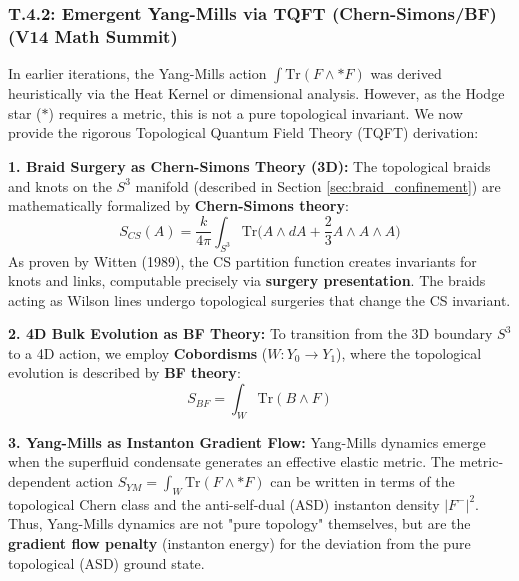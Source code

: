 \subsubsection{T.4.2: Emergent Yang-Mills via TQFT (Chern-Simons/BF) (V14 Math Summit)}
\label{sec:tqft_ym}

In earlier iterations, the Yang-Mills action $\int \text{Tr}(F \wedge *F)$ was derived heuristically via the Heat Kernel or dimensional analysis. However, as the Hodge star ($*$) requires a metric, this is not a pure topological invariant. We now provide the rigorous Topological Quantum Field Theory (TQFT) derivation:

\textbf{1. Braid Surgery as Chern-Simons Theory (3D):}
The topological braids and knots on the $S^3$ manifold (described in Section \ref{sec:braid_confinement}) are mathematically formalized by \textbf{Chern-Simons theory}:
\begin{equation}
    S_{CS}(A) = \frac{k}{4\pi} \int_{S^3} \text{Tr}\Big(A \wedge dA + \frac{2}{3}A \wedge A \wedge A \Big)
\end{equation}
As proven by Witten (1989), the CS partition function creates invariants for knots and links, computable precisely via \textbf{surgery presentation}. The braids acting as Wilson lines undergo topological surgeries that change the CS invariant.

\textbf{2. 4D Bulk Evolution as BF Theory:}
To transition from the 3D boundary $S^3$ to a 4D action, we employ \textbf{Cobordisms} ($W: Y_0 \to Y_1$), where the topological evolution is described by \textbf{BF theory}:
\begin{equation}
    S_{BF} = \int_W \text{Tr}(B \wedge F)
\end{equation}

\textbf{3. Yang-Mills as Instanton Gradient Flow:}
Yang-Mills dynamics emerge when the superfluid condensate generates an effective elastic metric. The metric-dependent action $S_{YM} = \int_W \text{Tr}(F \wedge *F)$ can be written in terms of the topological Chern class and the anti-self-dual (ASD) instanton density $|F^-|^2$.
Thus, Yang-Mills dynamics are not "pure topology" themselves, but are the \textbf{gradient flow penalty} (instanton energy) for the deviation from the pure topological (ASD) ground state.

